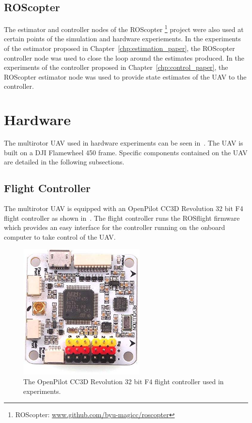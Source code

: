 \subsection {ROScopter}
The estimator and controller nodes of the ROScopter
\footnote{ROScopter:
\href{www.github.com/byu-magicc/roscopter}{www.github.com/byu-magicc/roscopter}}
project were also used at certain points of the simulation and hardware
experiements. In the experiments of the estimator proposed  in
Chapter~\ref{chp:estimation_paper}, the ROScopter controller node was used to
close the loop around the estimates produced. In the experiments of the 
controller proposed in Chapter~\ref{chp:control_paper}, the ROScopter estimator node
was used to provide state estimates of the UAV to the controller.

\section{Hardware}
The multirotor UAV used in hardware experiments can be seen
in~. The UAV is built on a DJI Flamewheel 450 frame.
Specific components contained on the UAV are detailed in the following
subsections.

\subsection{Flight Controller}
The multirotor UAV is equipped with an OpenPilot CC3D Revolution 32 bit F4
flight controller as shown in~. The flight controller runs the
ROSflight firmware~\cite{jackson2016rosflight} which provides an easy interface
for the controller running on the onboard computer to take control of the UAV.

\begin{figure}[htbp]
  \centering
  \includegraphics[width=2.5in]{figures/f4.jpg}
  \caption[OpenPilot CC3D Revolution 32 bit F4]{ The OpenPilot CC3D Revolution 32
  bit F4 flight controller used in experiments.}
%
  \label{fig:f4}
\end{figure}

